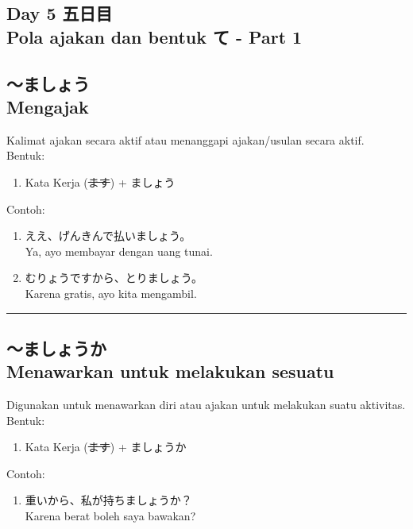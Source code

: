 \begin{flushright}
    \section*{\Large{Day 5 五日目 \\
    Pola ajakan dan bentuk て - Part 1}}
\end{flushright}

\subsection*{
    ～ましょう \\ 
    Mengajak
}
Kalimat ajakan secara aktif atau menanggapi ajakan/usulan 
secara aktif.\\
Bentuk:
\begin{enumerate}
    \item Kata Kerja (\sout{ます}) + ましょう
\end{enumerate}
Contoh: 
\begin{enumerate}
    \item ええ、げんきんで払いましょう。
    \\ Ya, ayo membayar dengan uang tunai.
    \item むりょうですから、とりましょう。
    \\ Karena gratis, ayo kita mengambil.
\end{enumerate}

\vspace{0.2cm}\hrule height 1pt\vspace{0.2cm}


\subsection*{
    ～ましょうか \\
    Menawarkan untuk melakukan sesuatu
}
Digunakan untuk menawarkan diri atau ajakan untuk melakukan 
suatu aktivitas.\\
Bentuk:
\begin{enumerate}
    \item Kata Kerja (\sout{ます}) + ましょうか
\end{enumerate}
Contoh: 
\begin{enumerate}
    \item 重いから、私が持ちましょうか？
    \\ Karena berat boleh saya bawakan?
\end{enumerate}


